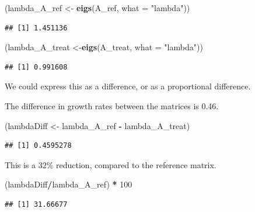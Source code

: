\documentclass[
  a4paper]{book}
\newenvironment{Shaded}{\begin{snugshade}}{\end{snugshade}}
\newcommand{\AttributeTok}[1]{\textcolor[rgb]{0.13,0.29,0.53}{#1}}
\newcommand{\DecValTok}[1]{\textcolor[rgb]{0.00,0.00,0.81}{#1}}
\newcommand{\FunctionTok}[1]{\textcolor[rgb]{0.13,0.29,0.53}{\textbf{#1}}}
\newcommand{\NormalTok}[1]{#1}
\newcommand{\OtherTok}[1]{\textcolor[rgb]{0.56,0.35,0.01}{#1}}
\newcommand{\SpecialCharTok}[1]{\textcolor[rgb]{0.81,0.36,0.00}{\textbf{#1}}}
\newcommand{\StringTok}[1]{\textcolor[rgb]{0.31,0.60,0.02}{#1}}
\begin{document}
\begin{Shaded}
\begin{Highlighting}[]
\NormalTok{(lambda\_A\_ref }\OtherTok{\textless{}{-}} \FunctionTok{eigs}\NormalTok{(A\_ref, }\AttributeTok{what =} \StringTok{"lambda"}\NormalTok{))}
\end{Highlighting}
\end{Shaded}

\begin{verbatim}
## [1] 1.451136
\end{verbatim}

\begin{Shaded}
\begin{Highlighting}[]
\NormalTok{(lambda\_A\_treat }\OtherTok{\textless{}{-}}\FunctionTok{eigs}\NormalTok{(A\_treat, }\AttributeTok{what =} \StringTok{"lambda"}\NormalTok{))}
\end{Highlighting}
\end{Shaded}

\begin{verbatim}
## [1] 0.991608
\end{verbatim}

We could express this as a difference, or as a proportional difference.

The difference in growth rates between the matrices is 0.46.

\begin{Shaded}
\begin{Highlighting}[]
\NormalTok{(lambdaDiff }\OtherTok{\textless{}{-}}\NormalTok{ lambda\_A\_ref }\SpecialCharTok{{-}}\NormalTok{ lambda\_A\_treat)}
\end{Highlighting}
\end{Shaded}

\begin{verbatim}
## [1] 0.4595278
\end{verbatim}

This is a 32\% reduction, compared to the reference matrix.

\begin{Shaded}
\begin{Highlighting}[]
\NormalTok{(lambdaDiff}\SpecialCharTok{/}\NormalTok{lambda\_A\_ref) }\SpecialCharTok{*} \DecValTok{100}
\end{Highlighting}
\end{Shaded}

\begin{verbatim}
## [1] 31.66677
\end{verbatim}
\end{document}
